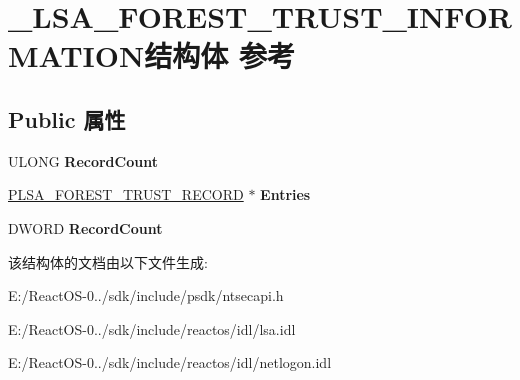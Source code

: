 \hypertarget{struct___l_s_a___f_o_r_e_s_t___t_r_u_s_t___i_n_f_o_r_m_a_t_i_o_n}{}\section{\+\_\+\+L\+S\+A\+\_\+\+F\+O\+R\+E\+S\+T\+\_\+\+T\+R\+U\+S\+T\+\_\+\+I\+N\+F\+O\+R\+M\+A\+T\+I\+O\+N结构体 参考}
\label{struct___l_s_a___f_o_r_e_s_t___t_r_u_s_t___i_n_f_o_r_m_a_t_i_o_n}
\subsection*{Public 属性}
\begin{DoxyCompactItemize}
\item 
\mbox{\label{struct___l_s_a___f_o_r_e_s_t___t_r_u_s_t___i_n_f_o_r_m_a_t_i_o_n_adc8f613d557c8da97f16307c770258d3}} 
U\+L\+O\+NG {\bfseries Record\+Count}
\item 
\mbox{\label{struct___l_s_a___f_o_r_e_s_t___t_r_u_s_t___i_n_f_o_r_m_a_t_i_o_n_aaf164133aa183536181932ab7e654f1c}} 
\hyperlink{struct___l_s_a___f_o_r_e_s_t___t_r_u_s_t___r_e_c_o_r_d}{P\+L\+S\+A\+\_\+\+F\+O\+R\+E\+S\+T\+\_\+\+T\+R\+U\+S\+T\+\_\+\+R\+E\+C\+O\+RD} $\ast$ {\bfseries Entries}
\item 
\mbox{\label{struct___l_s_a___f_o_r_e_s_t___t_r_u_s_t___i_n_f_o_r_m_a_t_i_o_n_a24d3e1e40250c84c77cfea66eeb1524d}} 
D\+W\+O\+RD {\bfseries Record\+Count}
\end{DoxyCompactItemize}


该结构体的文档由以下文件生成\+:\begin{DoxyCompactItemize}
\item 
E\+:/\+React\+O\+S-\/0../sdk/include/psdk/ntsecapi.\+h\item 
E\+:/\+React\+O\+S-\/0../sdk/include/reactos/idl/lsa.\+idl\item 
E\+:/\+React\+O\+S-\/0../sdk/include/reactos/idl/netlogon.\+idl\end{DoxyCompactItemize}
